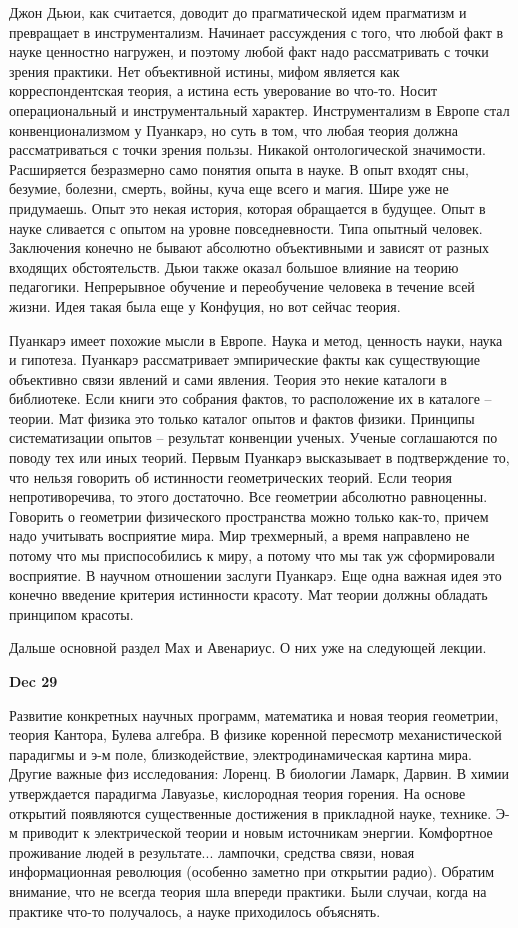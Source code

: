 \documentclass[a4paper, 12pt]{article}
\begin{document}
Джон Дьюи, как считается, доводит до прагматической идем прагматизм 
и превращает в инструментализм. Начинает рассуждения с того, что любой 
факт в науке ценностно нагружен, и поэтому любой факт надо рассматривать 
с точки зрения практики. Нет объективной истины, мифом является как 
корреспондентская теория, а истина есть уверование во что-то. Носит 
операциональный и инструментальный характер. Инструментализм в Европе 
стал конвенционализмом у Пуанкарэ, но суть в том, что любая теория 
должна рассматриваться с точки зрения пользы. Никакой онтологической 
значимости. Расширяется безразмерно само понятия опыта в науке. В опыт 
входят сны, безумие, болезни, смерть, войны, куча еще всего и магия. 
Шире уже не придумаешь. Опыт это некая история, которая обращается 
в будущее. Опыт в науке сливается с опытом на уровне повседневности. 
Типа опытный человек. Заключения конечно не бывают абсолютно 
объективными и зависят от разных входящих обстоятельств. Дьюи также 
оказал большое влияние на теорию педагогики. Непрерывное обучение 
и переобучение человека в течение всей жизни. Идея такая была еще 
у Конфуция, но вот сейчас теория.

Пуанкарэ имеет похожие мысли в Европе. Наука и метод, ценность науки, 
наука и гипотеза. Пуанкарэ рассматривает эмпирические факты как 
существующие объективно связи явлений и сами явления. Теория это некие 
каталоги в библиотеке. Если книги это собрания фактов, то расположение 
их в каталоге -- теории. Мат физика это только каталог опытов и фактов 
физики. Принципы систематизации опытов -- результат конвенции ученых. 
Ученые соглашаются по поводу тех или иных теорий. Первым Пуанкарэ 
высказывает в подтверждение то, что нельзя говорить об истинности 
геометрических теорий. Если теория непротиворечива, то этого достаточно. 
Все геометрии абсолютно равноценны. Говорить о геометрии физического 
пространства можно только как-то, причем надо учитывать восприятие мира. 
Мир трехмерный, а время направлено не потому что мы приспособились 
к миру, а потому что мы так уж сформировали восприятие. В научном 
отношении заслуги Пуанкарэ. Еще одна важная идея это конечно введение 
критерия истинности красоту. Мат теории должны обладать принципом 
красоты.

Дальше основной раздел Мах и Авенариус. О них уже на следующей лекции.

\hfill \textbf{Dec 29}

Развитие конкретных научных программ, математика и новая теория 
геометрии, теория Кантора, Булева алгебра. В физике коренной пересмотр 
механистической парадигмы и э-м поле, близкодействие, 
электродинамическая картина мира. Другие важные физ исследования: 
Лоренц. В биологии Ламарк, Дарвин. В химии утверждается парадигма 
Лавуазье, кислородная теория горения. На основе открытий появляются 
существенные достижения в прикладной науке, технике. Э-м приводит 
к электрической теории и новым источникам энергии. Комфортное проживание 
людей в результате... лампочки, средства связи, новая информационная 
революция (особенно заметно при открытии радио). Обратим внимание, что 
не всегда теория шла впереди практики. Были случаи, когда на практике 
что-то получалось, а науке приходилось объяснять.
\end{document}
